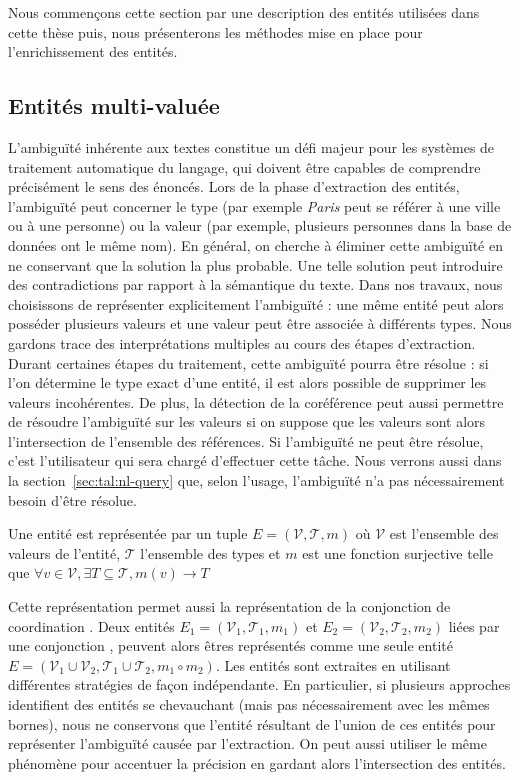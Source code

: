 Nous commençons cette section par une description des entités utilisées dans cette thèse puis, nous présenterons les méthodes mise en place pour l'enrichissement des entités.

\subsection{Entités multi-valuée}

L'ambiguïté inhérente aux textes constitue un défi majeur pour les systèmes de traitement automatique du langage, qui doivent être capables de comprendre précisément le sens des énoncés.
Lors de la phase d'extraction des entités, l'ambiguïté peut concerner le type (par exemple \textit{Paris} peut se référer à une ville ou à une personne) ou la valeur (par exemple, plusieurs personnes dans la base de données ont le même nom).
En général, on cherche à éliminer cette ambiguïté en ne conservant que la solution la plus probable.
Une telle solution peut introduire des contradictions par rapport à la sémantique du texte.
Dans nos travaux, nous choisissons de représenter explicitement l'ambiguïté : une même entité peut alors posséder plusieurs valeurs et une valeur peut être associée à différents types.
Nous gardons trace des interprétations multiples au cours des étapes d'extraction.
Durant certaines étapes du traitement, cette ambiguïté pourra être résolue : si l'on détermine le type exact d'une entité, il est alors possible de supprimer les valeurs incohérentes.
De plus, la détection de la coréférence peut aussi permettre de résoudre l'ambiguïté sur les valeurs si on suppose que les valeurs sont alors l'intersection de l'ensemble des références.
Si l'ambiguïté ne peut être résolue, c'est l'utilisateur qui sera chargé d'effectuer cette tâche.
Nous verrons aussi dans la section~\ref{sec:tal:nl-query} que, selon l'usage, l'ambiguïté n'a pas nécessairement besoin d'être résolue.

\begin{definition}
    Une entité est représentée par un tuple $E = (\mathcal{V}, \mathcal{T},  m)$ où $\mathcal{V}$ est l'ensemble des valeurs de l'entité, $\mathcal{T}$ l'ensemble des types et $m$ est une fonction surjective telle que $\forall v \in \mathcal{V}, \exists T \subseteq \mathcal{T}, m(v) \rightarrow T$
\end{definition}

Cette représentation permet aussi la représentation de la conjonction de coordination .
Deux entités $E_1 = (\mathcal{V}_1, \mathcal{T}_1, m_1)$ et $E_2 = (\mathcal{V}_2, \mathcal{T}_2, m_2)$ liées par une conjonction , peuvent alors êtres représentés comme une seule entité $E = (\mathcal{V}_1 \cup \mathcal{V}_2, \mathcal{T}_1 \cup \mathcal{T}_2, m_1 \circ m_2)$.
Les entités sont extraites en utilisant différentes stratégies de façon indépendante.
En particulier, si plusieurs approches identifient des entités se chevauchant (mais pas nécessairement avec les mêmes bornes), nous ne conservons que l'entité résultant de l'union de ces entités pour représenter l'ambiguïté causée par l'extraction.
On peut aussi utiliser le même phénomène pour accentuer la précision en gardant alors l'intersection des entités.

